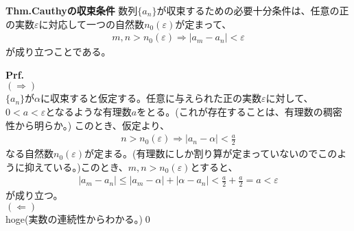 \documentclass[a4paper,11pt]{jsarticle}
\numberwithin{equation}{section}
\begin{document}
\begin{itembox}[l]{\textbf{Thm.Cauthyの収束条件}}
    数列$\{a_n\}$が収束するための必要十分条件は、任意の正の実数$\varepsilon$に対応して一つの自然数$n_0(\varepsilon)$が定まって、
    \begin{align}
        m,n > n_0(\varepsilon) \Rightarrow |a_m - a_n| < \varepsilon
    \end{align}
    が成り立つことである。
\end{itembox}
\textbf{Prf.}\\
$(\Rightarrow)$\\
$\{a_n\}$が$\alpha$に収束すると仮定する。任意に与えられた正の実数$\varepsilon$に対して、$0 <a < \varepsilon$となるような有理数$a$をとる。(これが存在することは、有理数の稠密性から明らか。)
このとき、仮定より、
\begin{align}
    n > n_0(\varepsilon) \Rightarrow |a_n - \alpha| < \frac{a}{2}
\end{align}
なる自然数$n_0(\varepsilon)$が定まる。(有理数にしか割り算が定まっていないのでこのように抑えている。)このとき、$m,n > n_0(\varepsilon)$とすると、
\begin{align}
    |a_m - a_n| \leq |a_m - \alpha| + |\alpha - a_n| < \frac{a}{2} + \frac{a}{2} = a < \varepsilon
\end{align}
が成り立つ。\\
$(\Leftarrow)$\\
hoge(実数の連続性からわかる。)\qed
\end{document}
